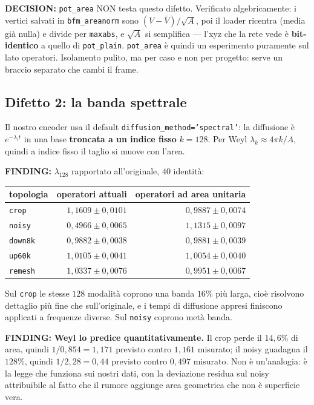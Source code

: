 \documentclass[11pt,a4paper]{article}
\newcommand{\finding}[1]{\textcolor{finding}{\textbf{FINDING:}} #1}
\newcommand{\decision}[1]{\textcolor{decision}{\textbf{DECISION:}} #1}
\begin{document}
\decision{\texttt{pot\_area} NON testa questo difetto. Verificato algebricamente: i vertici
salvati in \texttt{bfm\_areanorm} sono $(V-\bar V)/\sqrt{A}$, poi il loader ricentra (media gi\`a
nulla) e divide per \texttt{maxabs}, e $\sqrt{A}$ si semplifica --- l'xyz che la rete vede \`e
\textbf{bit-identico} a quello di \texttt{pot\_plain}. \texttt{pot\_area} \`e quindi un
esperimento puramente sul lato operatori. Isolamento pulito, ma per caso e non per progetto:
serve un braccio separato che cambi il frame.}

\subsection*{Difetto 2: la banda spettrale}

Il nostro encoder usa il default \texttt{diffusion\_method='spectral'}: la diffusione \`e
$e^{-\lambda_i t}$ in una base \textbf{troncata a un indice fisso} $k=128$. Per Weyl
$\lambda_k \approx 4\pi k/A$, quindi a indice fisso il taglio si muove con l'area.

\finding{$\lambda_{128}$ rapportato all'originale, $40$ identit\`a:}

\begin{center}\small
\begin{tabular}{lrr}
\toprule
topologia & operatori attuali & operatori ad area unitaria \\
\midrule
\texttt{crop}   & $1{,}1609 \pm 0{,}0101$ & $0{,}9887 \pm 0{,}0074$ \\
\texttt{noisy}  & $0{,}4966 \pm 0{,}0065$ & $1{,}1315 \pm 0{,}0097$ \\
\texttt{down8k} & $0{,}9882 \pm 0{,}0038$ & $0{,}9881 \pm 0{,}0039$ \\
\texttt{up60k}  & $1{,}0105 \pm 0{,}0041$ & $1{,}0054 \pm 0{,}0040$ \\
\texttt{remesh} & $1{,}0337 \pm 0{,}0076$ & $0{,}9951 \pm 0{,}0067$ \\
\bottomrule
\end{tabular}
\end{center}

Sul \texttt{crop} le stesse $128$ modalit\`a coprono una banda $16\%$ pi\`u larga, cio\`e
risolvono dettaglio pi\`u fine che sull'originale, e i tempi di diffusione appresi finiscono
applicati a frequenze diverse. Sul \texttt{noisy} coprono met\`a banda.

\finding{\textbf{Weyl lo predice quantitativamente.} Il crop perde il $14{,}6\%$ di area, quindi
$1/0{,}854 = 1{,}171$ previsto contro $1{,}161$ misurato; il noisy guadagna il $128\%$, quindi
$1/2{,}28 = 0{,}44$ previsto contro $0{,}497$ misurato. Non \`e un'analogia: \`e la legge che
funziona sui nostri dati, con la deviazione residua sul noisy attribuibile al fatto che il
rumore aggiunge area geometrica che non \`e superficie vera.}
\end{document}
